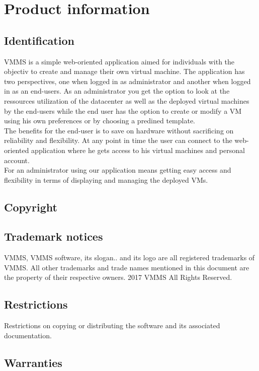 \chapter{Product information}
\vspace{-6em}


\section{Identification}
VMMS is a simple web-oriented application aimed for individuals with the
objectiv to create and manage their own virtual machine. The application    
has two perspectives, one when logged in as administrator and another when
logged in as an end-users. As an administrator you get the option to look at
the ressources utilization of the datacenter as well as the deployed virtual
machines by the end-users while the end user has the option to create or modify 
a VM using his own preferences or by choosing a predined template.\\The benefits
for the end-user is to save on hardware without sacrificing on reliability and 
flexibility. At any point in time the user can connect to the web-oriented
application where he gets access to his virtual machines and personal
account.\\For an administrator using our application means getting easy access 
and flexibility in terms of displaying and managing the deployed VMs.

\section{Copyright}


\section{Trademark notices}

VMMS, VMMS software, its slogan.. and its logo are all registered trademarks of
VMMS. All other trademarks and trade names mentioned in this document are the
property of their respective owners. 2017 VMMS All Rights Reserved.

\section{Restrictions}
Restrictions on copying or distributing the software and its associated
documentation.

\section{Warranties}


